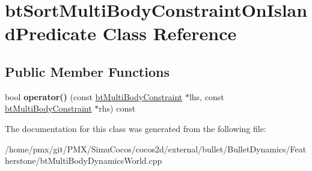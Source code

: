 \hypertarget{classbtSortMultiBodyConstraintOnIslandPredicate}{}\section{bt\+Sort\+Multi\+Body\+Constraint\+On\+Island\+Predicate Class Reference}
\label{classbtSortMultiBodyConstraintOnIslandPredicate}
\subsection*{Public Member Functions}
\begin{DoxyCompactItemize}
\item 
\mbox{\label{classbtSortMultiBodyConstraintOnIslandPredicate_abbccdfa33d323c20accb66299f06f9a2}} 
bool {\bfseries operator()} (const \hyperlink{classbtMultiBodyConstraint}{bt\+Multi\+Body\+Constraint} $\ast$lhs, const \hyperlink{classbtMultiBodyConstraint}{bt\+Multi\+Body\+Constraint} $\ast$rhs) const
\end{DoxyCompactItemize}


The documentation for this class was generated from the following file\+:\begin{DoxyCompactItemize}
\item 
/home/pmx/git/\+P\+M\+X/\+Simu\+Cocos/cocos2d/external/bullet/\+Bullet\+Dynamics/\+Featherstone/bt\+Multi\+Body\+Dynamics\+World.\+cpp\end{DoxyCompactItemize}
